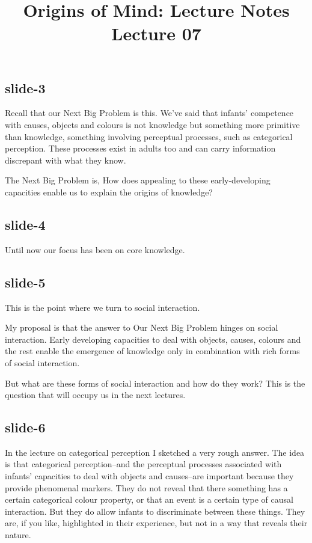 \documentclass[12pt,\papersize]{extarticle}
\begin{document}
\setlength\footnotesep{1em}






\title {Origins of Mind: Lecture Notes \\ Lecture 07}
 
 
 
\maketitle
 
\subsection{slide-3}
Recall that our Next Big Problem is this. 
We've said that infants' competence with causes, objects and colours is not knowledge but 
something more primitive than knowledge, 
something involving perceptual processes, such as categorical perception.
These processes exist in adults too and can carry information 
discrepant with what they know.
 
The Next Big Problem is, How does appealing to these early-developing capacities 
enable us to explain the origins of knowledge?
 
\subsection{slide-4}
Until now our focus has been on core knowledge.
 
\subsection{slide-5}
This is the point where we turn to social interaction.
 
My proposal is that the answer to Our Next Big Problem hinges on social interaction.
Early developing capacities to deal with objects, causes, colours and the rest enable the
emergence of knowledge only in combination with rich forms of social interaction.
 
But what are these forms of social interaction and how do they work?
This is the question that will occupy us in the next lectures.
 
\subsection{slide-6}
In the lecture on categorical perception I sketched a very rough answer.
The idea is that categorical perception--and the perceptual processes associated with infants'
capacities to deal with objects and causes--are important because they provide phenomenal 
markers.  
They do not reveal that there something has a certain categorical colour property, or that
an event is a certain type of causal interaction.
But they do allow infants to discriminate between these things.
They are, if you like, highlighted in their experience, but not in a way that reveals their 
nature.
 
\end{document}
